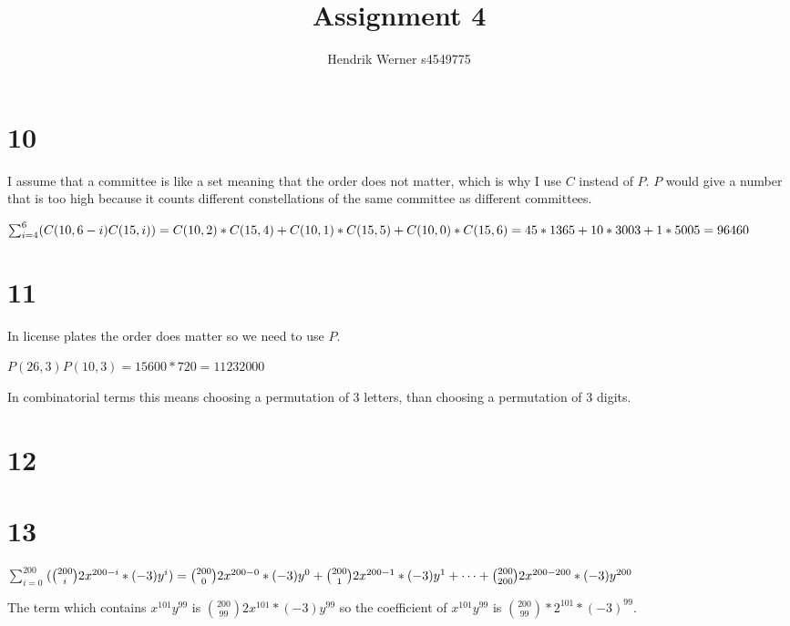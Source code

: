 \documentclass[12pt]{article}
\title {Assignment 4}
\author {Hendrik Werner s4549775}
\begin{document}
\maketitle

\section*{10}
I assume that a committee is like a set meaning that the order does not matter, which is why I use $C$ instead of $P$. $P$ would give a number that is too high because it counts different constellations of the same committee as different committees.

$\sum_{i = 4}^{6}(C(10, 6 - i)C(15, i))\\
= C(10, 2) * C(15, 4) + C(10, 1) * C(15, 5) + C(10, 0) * C(15, 6)\\
= 45 * 1365 + 10 * 3003 + 1 * 5005 = 96460$

\section*{11}
In license plates the order does matter so we need to use $P$.

$P(26, 3)P(10, 3) = 15 600 * 720 = 11 232 000$

In combinatorial terms this means choosing a permutation of 3 letters, than choosing a permutation of 3 digits.

\section*{12}
\section*{13}
$\sum_{i = 0}^{200}$$(\binom{200}{i} 2x^{200 - i} * (-3)y^i)\\
= \binom{200}{0} 2x^{200 - 0} * (-3)y^0 + \binom{200}{1} 2x^{200 - 1} * (-3)y^1 + \dots + \binom{200}{200} 2x^{200 - 200} * (-3)y^{200}$

The term which contains $x^{101}y^{99}$ is $\binom{200}{99} 2x^{101} * (-3)y^{99}$ so the coefficient of $x^{101}y^{99}$ is $\binom{200}{99} * 2^{101} * (-3)^{99}$.
\end{document}
